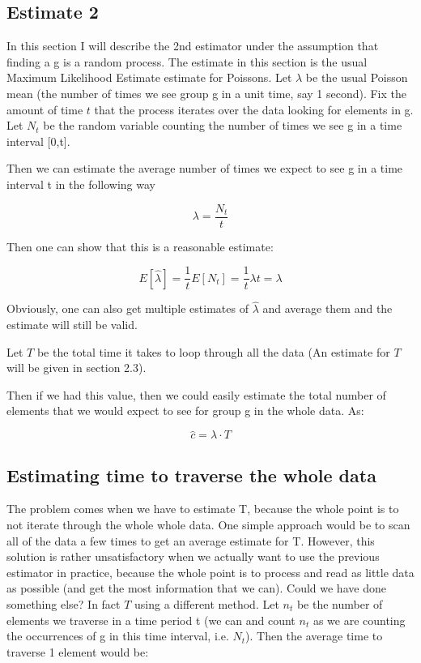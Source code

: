 \documentclass[a4paper]{article}
\begin{document}
\subsection{Estimate 2}

In this section I will describe the 2nd estimator under the assumption that finding a g is a random process.
The estimate in this section is the usual Maximum Likelihood Estimate estimate for Poissons.
Let $\lambda$ be the usual Poisson mean (the number of times we see group g in a unit time, say 1 second).
Fix the amount of time $t$ that the process iterates over the data looking for elements in g.
Let $N_t$ be the random variable counting the number of times we see g in a time interval [0,t].

Then we can estimate the average number of times we expect to see g in a time interval t in the following way

$$ \lambda = \frac{N_t}{t}$$

Then one can show that this is a reasonable estimate:

$$E[\hat{\lambda}] =\frac{1}{t}E[N_t]=\frac{1}{t}\lambda t=\lambda$$

Obviously, one can also get multiple estimates of $\hat{\lambda}$ and average them and the estimate will still be valid.

Let $T$ be the total time it takes to loop through all the data 
(An estimate for $T$ will be given in section 2.3).

Then if we had this value, then we could easily estimate the total number of elements that we would expect to see for group g in the whole data. As:

$$\hat{c} = \lambda \cdot T$$


\subsection{Estimating time to traverse the whole data}

The problem comes when we have to estimate T, because the whole point is to not iterate through the whole whole data.
One simple approach would be to scan all of the data a few times to get an average estimate for T.
However, this solution is rather unsatisfactory when we actually want to use the previous estimator in practice, because the whole point is to process and read as little data as possible (and get the most information that we can). 
Could we have done something else?
In fact $T$ using a different method.
Let $n_t$ be the number of elements we traverse in a time period t (we can and count $n_t$ as we are counting the occurrences of g in this time interval, i.e. $N_t$).
Then the average time to traverse 1 element would be:
\end{document}
